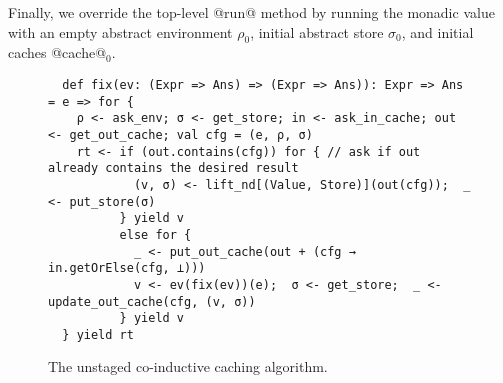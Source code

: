 Finally, we override the top-level @run@ method by running the monadic value
with an empty abstract environment $\rho_0$, initial abstract store $\sigma_0$,
and initial caches @cache@$_0$.

\begin{figure}[t]
  \centering
\begin{lstlisting}
  def fix(ev: (Expr => Ans) => (Expr => Ans)): Expr => Ans = e => for {
    ρ <- ask_env; σ <- get_store; in <- ask_in_cache; out <- get_out_cache; val cfg = (e, ρ, σ)
    rt <- if (out.contains(cfg)) for { // ask if out already contains the desired result
            (v, σ) <- lift_nd[(Value, Store)](out(cfg));  _ <- put_store(σ)
          } yield v
          else for {
            _ <- put_out_cache(out + (cfg → in.getOrElse(cfg, ⊥)))
            v <- ev(fix(ev))(e);  σ <- get_store;  _ <- update_out_cache(cfg, (v, σ))
          } yield v
  } yield rt
\end{lstlisting}
\vspace{-1em}
\caption{The unstaged co-inductive caching algorithm.}
\label{fig:coind_cache}
\vspace{-1em}
\end{figure}

